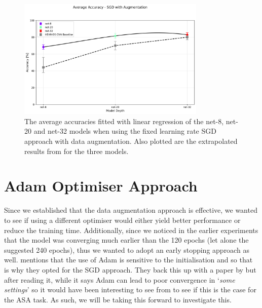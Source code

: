 \documentclass[logo,bsc,singlespacing,parskip,online]{infthesis}
\begin{document}
\begin{figure}[h]
   \centering
   \includegraphics[width=0.8\textwidth]{average_accuracies_sgd_aug.png}
   \caption{The average accuracies fitted with linear regression of the net-8, net-20 and net-32 models when using the fixed learning rate SGD approach with data augmentation.
   Also plotted are the extrapolated results from \citet{Huwel2020HearDS} for the three models.
   }
   \label{fig:data-augmentation-accuracies}
\end{figure}

\section{Adam Optimiser Approach}
Since we established that the data augmentation approach is effective, we wanted to see 
if using a different optimiser would either yield better performance or reduce the 
training time. Additionally, since we noticed in the earlier experiments 
that the model was converging much earlier than the 120 epochs (let alone the suggested 
240 epochs), thus we wanted to adopt an early stopping approach as well.
\citet{Huwel2020HearDS} mentions that the use of Adam is sensitive to the initialisation 
and so that is why they opted for the SGD approach. 
They back this up with a paper by \citet{} 
but after reading it, while it says 
Adam can lead to poor convergence in `\textit{some settings}'
so it would have been interesting to see from \citet{Huwel2020HearDS}
to see if this is the case for the ASA task. As such, 
we will be taking this forward to investigate this.
\end{document}
